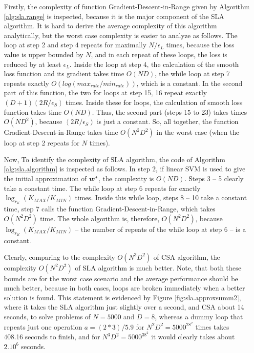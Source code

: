 Firstly, the complexity of function {\sc Gradient-Descent-in-Range}
given by Algorithm \ref{alg:sla.range} is inspected, because it is the
major component of the SLA algorithm. It is hard to derive the average
complexity of this algorithm analytically, but the worst case
complexity is easier to analyze as follows. The loop at step 2 and
step 4 repeats for maximally $N/\epsilon_L$ times, because the loss
value is upper bounded by $N$, and in each repeat of these loops, the
loss is reduced by at least $\epsilon_L$. Inside the loop at step 4,
the calculation of the smooth loss function and its gradient takes
time $O(ND)$, the while loop at step 7 repeats exactly
$O(log(max_{rate} / min_{rate}))$, which is a constant. In the second
part of this function, the two for loops at step 15, 16 repeat exactly
$(D+1) (2R/\epsilon_S)$ times. Inside these for loops, the calculation
of smooth loss function takes time $O(ND)$. Thus, the second part
(steps 15 to 23) takes times $O(ND^2)$, because $(2R/\epsilon_S)$ is
just a constant. So, all together, the function {\sc
  Gradient-Descent-in-Range} takes time $O(N^2D^2)$ in the worst case
(when the loop at step 2 repeats for $N$ times).

Now, To identify the complexity of SLA algorithm, the code of
Algorithm \ref{alg:sla.algorithm} is inspected as follows. In step 2,
if linear SVM is used to give the initial approximation of $\boldsymbol{w}^*$, the
complexity is $O(ND)$. Steps 3 -- 5 clearly take a constant time. The
while loop at step 6 repeats for exactly $\log_{r_K} (K_{MAX} /
K_{MIN})$ times. Inside this while loop, steps 8 -- 10 take a constant
time, step 7 calls the function {\sc Gradient-Descent-in-Range}, which
takes $O(N^2D^2)$ time. The whole algorithm is, therefore,
$O(N^2D^2)$, because $\log_{r_K} (K_{MAX} / K_{MIN})$ -- the number of
repeats of the while loop at step 6 -- is a constant.

Clearly, comparing to the complexity $O(N^3D^2)$ of CSA algorithm, the
complexity $O(N^2D^2)$ of SLA algorithm is much better. Note, that
both these bounds are for the worst case scenario and the average
performance should be much better, because in both cases, loops are
broken immediately when a better solution is found. This statement is
evidenced by Figure \ref{fig:sla.approxsumm2}, where it takes the SLA
algorithm just slightly over a second, and CSA about 14 seconds, to
solve problems of $N=5000$ and $D=8$, whereas a dummy loop that
repeats just one operation $a = (2*3)/5.9$ for $N^2D^2 = 5000^28^2$
times takes 408.16 seconds to finish, and for $N^3D^2 = 5000^38^2$ it
would clearly takes about $2.10^6$ seconds.

